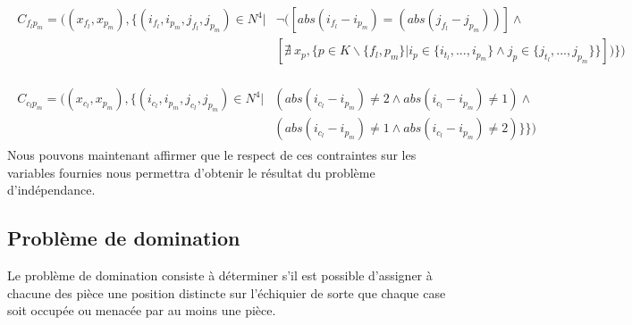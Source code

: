 \documentclass[a4paper]{article}
\begin{document}
\begin{align*}
\begin{split}
C_{f_lp_m} = ( (x_{f_l},x_{p_m}), \{ (i_{f_l},i_{p_m},j_{f_l},j_{p_m}) \in N^4 | & \neg( [ abs(i_{f_l} - i_{p_m}) = (abs(j_{f_l} - j_{p_m})) ]\wedge \\
& [ \nexists \ x_p, \{ p \in K \backslash \{f_l,p_m\} | i_{p} \in \{ i_{t_l},...,i_{p_m} \} \wedge j_p \in \{ j_{t_l},...,j_{p_m} \}\}  ] ) \} )
\end{split}
\end{align*}

\begin{align*}
\begin{split}
C_{c_lp_m} = ( (x_{c_l},x_{p_m}), \{ (i_{c_l},i_{p_m},j_{c_l},j_{p_m}) \in N^4 |& (abs(i_{c_l} - i_{p_m}) \neq 2 \wedge abs(i_{c_l} - i_{p_m}) \neq 1) \wedge \\
& (abs(i_{c_l} - i_{p_m}) \neq 1 \wedge abs(i_{c_l} - i_{p_m}) \neq 2)\} \} )
\end{split}
\end{align*}
Nous pouvons maintenant affirmer que le respect de ces contraintes sur les variables fournies nous permettra d'obtenir le résultat du problème d'indépendance. 

\subsection{Problème de domination}
Le problème de domination consiste à déterminer s’il est possible d’assigner à chacune des pièce une position distincte sur l'échiquier de sorte que chaque case soit occupée ou menacée par au moins une pièce.

\begin{center}
\end{center}
\end{document}
